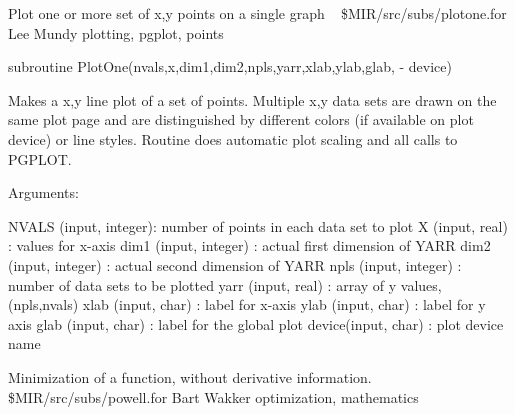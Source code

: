 %
\noindent Plot one or more set of x,y points on a single graph
\newline \ 
\newline {} \$MIR/src/subs/plotone.for
\newline {} Lee Mundy
\newline {} plotting, pgplot, points
\par{\tenpoint
{\eightpoint\begintt
      subroutine PlotOne(nvals,x,dim1,dim2,npls,yarr,xlab,ylab,glab,
     -                   device)

 Makes a x,y line plot of a set of points. Multiple x,y data sets
 are drawn on the same plot page and are distinguished by different
 colors (if available on plot device) or line styles. Routine does
 automatic plot scaling and all calls to PGPLOT.

 Arguments:

 NVALS (input, integer): number of points in each data set to plot
 X (input, real)       : values for x-axis
 dim1 (input, integer) : actual first dimension of YARR
 dim2 (input, integer) : actual second dimension of YARR
 npls (input, integer) : number of data sets to be plotted
 yarr (input, real)    : array of y values, (npls,nvals)
 xlab (input, char)    : label for x-axis
 ylab (input, char)    : label for y axis
 glab (input, char)    : label for the global plot
 device(input, char)   : plot device name
\endtt}
\par}
%
\noindent Minimization of a function, without derivative information.
\newline \ 
\newline \abox{File:} \$MIR/src/subs/powell.for
\newline {} Bart Wakker
\newline \abox{Keywords:} optimization, mathematics
